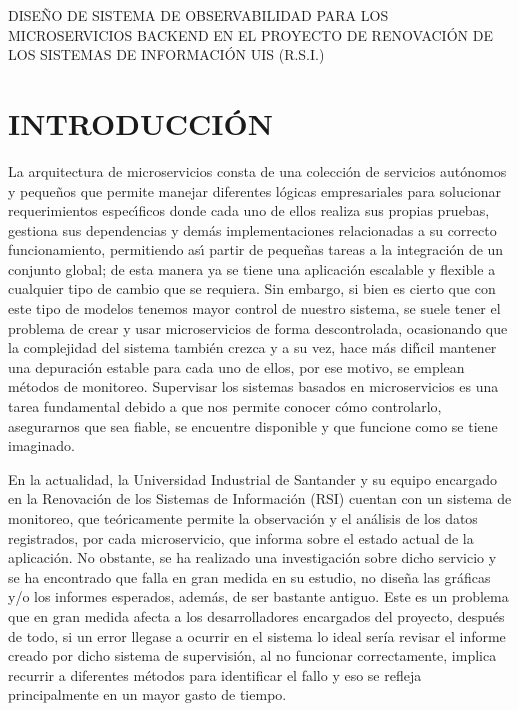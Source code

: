 \documentclass[a4paper,12pt]{article}
\begin{document}
\tableofcontents

\newpage

\begin{center}
\large DISEÑO DE SISTEMA DE OBSERVABILIDAD PARA LOS MICROSERVICIOS BACKEND EN EL PROYECTO DE RENOVACIÓN DE LOS SISTEMAS DE INFORMACIÓN UIS (R.S.I.)
\end{center}

\section{\large INTRODUCCIÓN}
\vspace{12pt}

La arquitectura de microservicios consta de una colección de servicios autónomos y pequeños que permite manejar diferentes lógicas empresariales para solucionar requerimientos especı́ficos donde cada uno de ellos realiza sus propias pruebas, gestiona sus dependencias y demás implementaciones relacionadas a su correcto funcionamiento, permitiendo ası́ partir de pequeñas tareas a la integración de un conjunto global; de esta manera ya se tiene una aplicación escalable y flexible a cualquier tipo de cambio que se requiera. Sin embargo, si bien es cierto que con este tipo de modelos tenemos mayor control de nuestro sistema, se suele tener el problema de crear y usar microservicios de forma descontrolada, ocasionando que la complejidad del sistema también crezca y a su vez, hace más difı́cil mantener una depuración estable para cada uno de ellos, por ese motivo, se emplean métodos de monitoreo. Supervisar los sistemas basados en microservicios es una tarea fundamental debido a que nos permite conocer cómo controlarlo, asegurarnos que sea fiable, se encuentre disponible y que funcione como se tiene imaginado.

\vspace{12pt}

En la actualidad, la Universidad Industrial de Santander y su equipo encargado en la Renovación de los Sistemas de Información (RSI) cuentan con un sistema de monitoreo, que teóricamente permite la observación y el análisis de los datos registrados, por cada microservicio, que informa sobre el estado actual de la aplicación. No obstante, se ha realizado una investigación sobre dicho servicio y se ha encontrado que falla en gran medida en su estudio, no diseña las gráficas y/o los informes esperados, además, de ser bastante antiguo. Este es un problema que en gran medida afecta a los desarrolladores encargados del proyecto, después de todo, si un error llegase a ocurrir en el sistema lo ideal sería revisar el informe creado por dicho sistema de supervisión, al no funcionar correctamente, implica recurrir a diferentes métodos para identificar el fallo y eso se refleja principalmente en un mayor gasto de tiempo.
\end{document}
